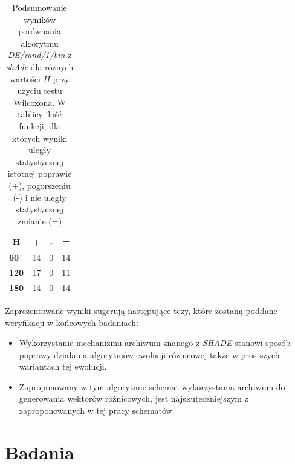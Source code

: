 \documentclass[12pt,a4paper]{report}
\begin{document}
{{{{{{{\begin{table}[h]
\centering
\caption{Podsumowanie wyników porównania algorytmu \emph{DE/rand/1/bin} z \emph{shAde} dla różnych wartości $H$ przy użyciu testu Wilcoxona. W tablicy ilość funkcji, dla których wyniki uległy statystycznej istotnej poprawie (+), pogorszeniu (-) i nie uległy statystycznej zmianie (=)}
\label{Anal13Sum}
\begin{tabular}{|l|l|l|l|}
\hline
\multicolumn{1}{|c|}{{\bf H}} & \multicolumn{1}{c|}{{\bf +}} & \multicolumn{1}{c|}{{\bf -}} & \multicolumn{1}{c|}{{\bf =}} \\ \hline
{\bf 60}                      & 14                           & 0                            & 14                           \\ \hline
{\bf 120}                     & 17                           & 0                            & 11                           \\ \hline
{\bf 180}                     & 14                           & 0                            & 14                           \\ \hline
\end{tabular}
\end{table}


\par{
Zaprezentowane wyniki sugerują następujące tezy, które zostaną poddane weryfikacji w końcowych badaniach:
\begin{itemize}
\item Wykorzystanie mechanizmu archiwum znanego z \emph{SHADE} stanowi sposób poprawy działania algorytmów ewolucji różnicowej także w prostszych wariantach tej ewolucji.
\item Zaproponowany w tym algorytmie schemat wykorzystania archiwum do generowania wektorów różnicowych, jest najskuteczniejszym z zaproponowanych w tej pracy schematów.
\end{itemize}
}

\chapter{Badania}
\label{badania}
}}}}}}}
\end{document}
